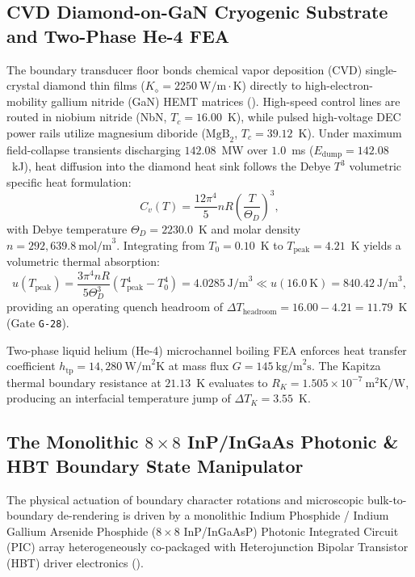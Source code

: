 \documentclass[11pt,onecolumn]{article}
\begin{document}
\subsection{CVD Diamond-on-GaN Cryogenic Substrate and Two-Phase He-4 FEA}
\label{subsec:diamond_cryo}
The boundary transducer floor bonds chemical vapor deposition (CVD) single-crystal diamond thin films ($K_\diamond = 2250~\text{W/m}\cdot\text{K}$) directly to high-electron-mobility gallium nitride (GaN) HEMT matrices (). High-speed control lines are routed in niobium nitride (NbN, $T_c = 16.00$~K), while pulsed high-voltage DEC power rails utilize magnesium diboride ($\text{MgB}_2$, $T_c = 39.12$~K). Under maximum field-collapse transients discharging $142.08$~MW over $1.0$~ms ($E_{\mathrm{dump}} = 142.08$~kJ), heat diffusion into the diamond heat sink follows the Debye $T^3$ volumetric specific heat formulation:
\begin{equation}
C_v(T) = \frac{12\pi^4}{5} n R \left(\frac{T}{\Theta_D}\right)^3,
\end{equation}
with Debye temperature $\Theta_D = 2230.0$~K and molar density $n = 292{,}639.8~\text{mol/m}^3$. Integrating from $T_0 = 0.10$~K to $T_{\text{peak}} = 4.21$~K yields a volumetric thermal absorption:
\begin{equation}
u(T_{\text{peak}}) = \frac{3\pi^4 n R}{5\Theta_D^3}\left(T_{\text{peak}}^4 - T_0^4\right) = 4.0285~\text{J/m}^3 \ll u(16.0~\text{K}) = 840.42~\text{J/m}^3,
\end{equation}
providing an operating quench headroom of $\Delta T_{\text{headroom}} = 16.00 - 4.21 = 11.79$~K (Gate \texttt{G-28}).

Two-phase liquid helium (He-4) microchannel boiling FEA enforces heat transfer coefficient $h_{\text{tp}} = 14{,}280~\text{W/m}^2\text{K}$ at mass flux $G = 145~\text{kg/m}^2\text{s}$. The Kapitza thermal boundary resistance at $21.13$~K evaluates to $R_K = 1.505 \times 10^{-7}~\text{m}^2\text{K/W}$, producing an interfacial temperature jump of $\Delta T_K = 3.55$~K.

\FloatBarrier
\subsection[The Monolithic 8x8 InP/InGaAs Photonic \& HBT Boundary State Manipulator]{The Monolithic \texorpdfstring{$8\times 8$}{8x8} InP/InGaAs Photonic \& HBT Boundary State Manipulator}
\label{sec:inpgas_manipulator}
The physical actuation of boundary character rotations and microscopic bulk-to-boundary de-rendering is driven by a monolithic Indium Phosphide / Indium Gallium Arsenide Phosphide ($8\times 8$ InP/InGaAsP) Photonic Integrated Circuit (PIC) array heterogeneously co-packaged with Heterojunction Bipolar Transistor (HBT) driver electronics ().
\end{document}
